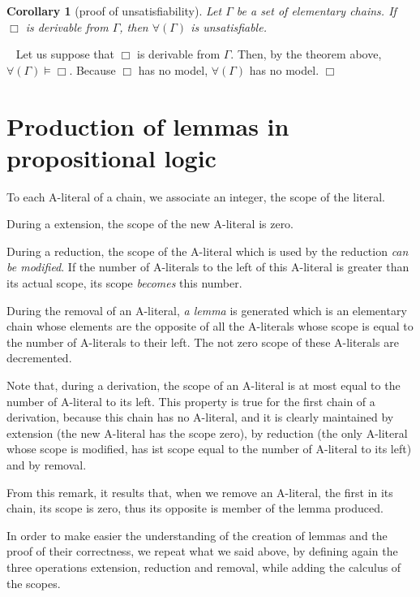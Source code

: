 \documentclass{article}
\newtheorem{corollaire}[theoreme]{Corollary}
\newenvironment{preuve}{\noindent {\em Proof :}\ }{{\hfill
    $\Box$}\vspace{.5pc}} \newcommand{\sg}{\!\!<\!\!}
\begin{document}
\begin{corollaire}[proof of unsatisfiability]\label{coherence-ME-1}
Let $\Gamma$ be a set of elementary chains. If $\Box$ is derivable from $\Gamma$, then $\forall(\Gamma)$ is unsatisfiable.
\end{corollaire}

\begin{preuve}
Let us suppose that $\Box$ is derivable from $\Gamma$. Then, by the theorem above, 
 $\forall(\Gamma) \models \Box$.
Because $\Box$ has no model,  $\forall(\Gamma)$ has no model.
\end{preuve}

\section{Production of lemmas in propositional logic}

To each A-literal of a chain, we associate an integer, the scope of the literal.

During a extension, the scope of the new A-literal is zero.

During a reduction, the scope of the A-literal which is used by the reduction \emph{can be modified}. If the number of
A-literals to the left of this A-literal is greater than its actual scope, its scope \emph{becomes} this number.

During the removal of an A-literal, \emph{a lemma} is generated which is an elementary chain whose elements are the opposite of
all the A-literals whose scope is equal to the number of A-literals to their left. The not zero scope of these A-literals are 
decremented.


Note that, during a derivation, the scope of an A-literal is at most equal to the number of A-literal to its left.
This property is true for the first chain of a derivation, because this chain has no A-literal, and it is clearly maintained
by extension (the new A-literal has the scope zero), by reduction (the only A-literal whose scope is modified, has ist scope
equal to the number of A-literal to its left) and by removal. 

From this remark, it results that, when we remove an A-literal, the first in its chain, its scope is zero, thus its opposite
is member of the lemma produced.

In order to make easier the understanding of the creation of lemmas and the proof of their correctness, we repeat what we said
above, by defining again the three operations extension, reduction and removal, while adding the calculus of the scopes. 
\end{document}
